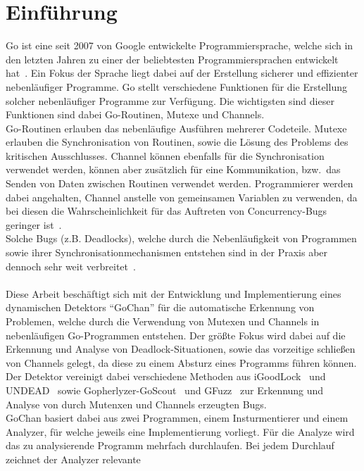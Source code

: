 \chapter{Einführung}\label{chap:introduction}
Go ist eine seit 2007 von Google entwickelte Programmiersprache, welche sich 
in den letzten Jahren zu einer der beliebtesten Programmiersprachen entwickelt 
hat~\cite{ranking}. Ein Fokus der Sprache liegt dabei auf der Erstellung
sicherer und effizienter nebenläufiger Programme. Go stellt verschiedene 
Funktionen für die Erstellung solcher nebenläufiger Programme zur Verfügung.
Die wichtigsten sind dieser Funktionen sind dabei Go-Routinen, Mutexe und 
Channels.\\Go-Routinen erlauben das nebenläufige Ausführen mehrerer Codeteile.
Mutexe erlauben die Synchronisation von Routinen, sowie die Lösung des Problems 
des kritischen Ausschlusses. 
Channel können ebenfalls für die Synchronisation verwendet werden,
können aber zusätzlich für eine Kommunikation, bzw.\ das Senden von Daten zwischen 
Routinen verwendet werden. Programmierer werden dabei angehalten, Channel
anstelle von gemeinsamen Variablen zu verwenden, da bei diesen die Wahrscheinlichkeit
für das Auftreten von Concurrency-Bugs geringer ist~\cite{sharedMemory}.\\
Solche Bugs (z.B. Deadlocks), welche durch die Nebenläufigkeit von Programmen sowie ihrer 
Synchronisationmechanismen entstehen sind in der Praxis aber dennoch sehr weit 
verbreitet~\cite{numberBugs}.\\\\
Diese Arbeit beschäftigt sich mit der Entwicklung und Implementierung
eines dynamischen Detektors ``GoChan'' für die automatische Erkennung
von Problemen, welche durch die Verwendung von Mutexen und Channels 
in nebenläufigen Go-Programmen entstehen. Der größte Fokus wird dabei 
auf die Erkennung und Analyse von Deadlock-Situationen, sowie das vorzeitige 
schließen von Channels gelegt, da diese zu einem Absturz eines Programms 
führen können. Der Detektor vereinigt dabei verschiedene Methoden aus 
iGoodLock~\cite{iGoodLock} und UNDEAD~\cite{Undead} sowie 
Gopherlyzer-GoScout~\cite{PPDP18} und GFuzz~\cite{gfuzz} zur 
Erkennung und Analyse von 
durch Mutenxen und Channels erzeugten Bugs.\\
GoChan basiert dabei aus zwei Programmen, einem Insturmentierer und einem 
Analyzer, für welche jeweils eine 
Implementierung vorliegt. Für die Analyze wird das zu analysierende Programm 
mehrfach durchlaufen. Bei jedem Durchlauf zeichnet der Analyzer relevante 
